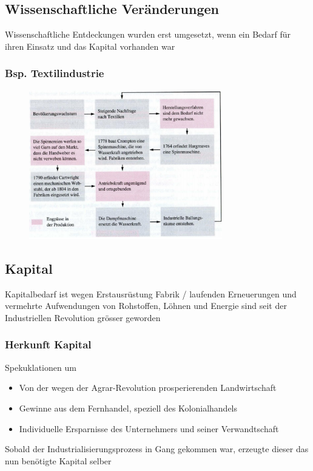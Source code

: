 \documentclass{report}
\begin{document}
\subsection{Wissenschaftliche Veränderungen}
Wissenschaftliche Entdeckungen wurden erst umgesetzt, wenn ein Bedarf für ihren Einsatz und das Kapital vorhanden war
\subsubsection{Bsp. Textilindustrie}
\begin{figure}[H]
	\centering
	\includegraphics[width=0.75\textwidth]{images/erfindungen-textilindustrie.png}
\end{figure}
\newpage

\subsection{Kapital}
Kapitalbedarf ist wegen Erstausrüstung Fabrik / laufenden Erneuerungen und vermehrte Aufwendungen von Rohstoffen, Löhnen und Energie sind seit der Industriellen Revolution grösser geworden

\subsubsection{Herkunft Kapital}
Spekuklationen um 
\begin{itemize}
	\item Von der wegen der Agrar-Revolution prosperierenden Landwirtschaft
	\item Gewinne aus dem Fernhandel, speziell des Kolonialhandels
	\item Individuelle Ersparnisse des Unternehmers und seiner Verwandtschaft
\end{itemize}
\arrow Sobald der Industrialisierungsprozess in Gang gekommen war, erzeugte dieser das nun benötigte Kapital selber
\end{document}
